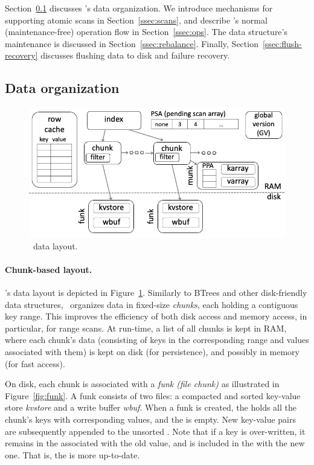 
Section~\ref{ssec:layout}  discusses \sys's data organization. 
We introduce mechanisms for supporting 
atomic scans  in Section~\ref{ssec:scans}, and describe \sys's
 normal (maintenance-free) operation flow  in Section~\ref{ssec:ops}.  
The data structure's maintenance is discussed in Section~\ref{ssec:rebalance}.
Finally, Section~\ref{ssec:flush-recovery} discusses flushing data to disk and failure recovery.


\subsection{Data organization}
\label{ssec:layout}

\begin{figure}[htb]
\centerline{
\includegraphics[width=\columnwidth]{PiWi.png}
}
\caption{\sys\ data layout.}
\label{fig:layout}
\end{figure}

\paragraph{Chunk-based layout.}

\sys's data layout is depicted in Figure~\ref{fig:layout}.
Similarly to BTrees {and other disk-friendly data structures}, 
\sys\ organizes data in fixed-size \emph{chunks}, each holding a contiguous key range.
This improves the efficiency of both disk access and memory access, in particular, for  range scans. 
At run-time, a list of all chunks is kept in RAM, where each chunk's data 
(consisting of keys in the corresponding range and values associated with them) 
is kept on disk (for persistence), and possibly in memory (for fast access). 

On disk, each chunk is associated with a  \emph{funk (file chunk)} as illustrated in 
Figure~\ref{fig:funk}. A funk
consists of two files:   
a compacted and sorted  key-value store \emph{kvstore} and a write buffer \emph{wbuf}. When a funk is created, the  holds all the chunk's keys with corresponding values, and the   is empty.
New key-value pairs are subsequently appended to the unsorted . Note that if a key is over-written, it remains in the  associated with the old value, and is included in the  with the new one.
That is, the  is more up-to-date.

